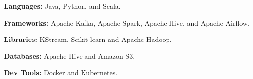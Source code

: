 \documentclass{article}
\begin{document}
\begin{flushleft}
\hspace{0.2cm}\textbf{Languages:}\hspace{0.52cm} Java, Python, and Scala.
\vspace{1.75mm}

\hspace{0.2cm}\textbf{Frameworks:}\hspace{0.22cm} Apache Kafka, Apache Spark, Apache Hive, and Apache Airflow.
\vspace{1.75mm}

\hspace{0.2cm}\textbf{Libraries:}\hspace{0.80cm} KStream, Scikit-learn and Apache Hadoop.
\vspace{1.75mm}

\hspace{0.2cm}\textbf{Databases:}\hspace{0.57cm} Apache Hive and Amazon S3.
\vspace{1.75mm}

\hspace{0.2cm}\textbf{Dev Tools:}\hspace{0.60cm} Docker and Kubernetes.
\vspace{-3.2mm}
\end{flushleft}
\end{document}
